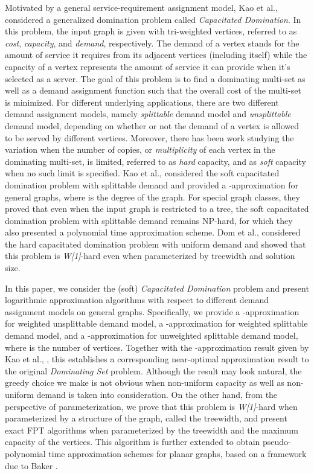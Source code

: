 \documentclass[a4paper,11pt]{article}
\theoremstyle{definition}
\begin{document}
Motivated by a general service-requirement assignment model, Kao et al., \cite{MJKCSLDTL09} considered a generalized domination problem called {\em Capacitated Domination}. In this problem, the input graph is given with tri-weighted vertices, referred to as {\em cost}, {\em capacity}, and {\em demand}, respectively. The demand of a vertex stands for the amount of service it requires from its adjacent vertices (including itself) while the capacity of a vertex represents the amount of service it can provide when it's selected as a server. The goal of this problem is to find a dominating multi-set as well as a demand assignment function such that the overall cost of the multi-set is minimized. For different underlying applications, there are two different demand assignment models, namely {\em splittable} demand model and {\em unsplittable} demand model, depending on whether or not the demand of a vertex is allowed to be served by different vertices. Moreover, there has been work studying the variation when the number of copies, or {\it multiplicity} of each vertex in the dominating multi-set, is limited, referred to as {\em hard} capacity, and as {\em soft} capacity when no such limit is specified. Kao et al., \cite{MJKCSLDTL09} considered the soft capacitated domination problem with splittable demand and provided a -approximation for general graphs, where  is the degree of the graph. For special graph classes, they proved that even when the input graph is restricted to a tree, the soft capacitated domination problem with splittable demand remains NP-hard, for which they also presented a polynomial time approximation scheme. Dom et al., \cite{DBLP:conf/iwpec/DomLSV08} considered the hard capacitated domination problem with uniform demand and showed that this problem is {\it W[1]}-hard even when parameterized by treewidth and solution size.

\smallskip



In this paper, we consider the (soft) {\em Capacitated Domination} problem and present logarithmic approximation algorithms with respect to different demand assignment models on general graphs. Specifically, we provide a -approximation
for weighted unsplittable demand model, a -approximation for weighted splittable demand model, and a -approximation for unweighted splittable demand model, where  is the number of vertices. Together with the -approximation result given by Kao et al., \cite{MJKCSLDTL09}, this establishes a corresponding near-optimal approximation result to the original {\em Dominating Set} problem. Although the result may look natural, the greedy choice we make is not obvious when non-uniform capacity as well as non-uniform demand is taken into consideration. On the other hand, from the perspective of parameterization, we prove that this problem is {\it W[1]}-hard when parameterized by a structure of the graph, called the treewidth, and present exact FPT algorithms when parameterized by the treewidth and the maximum capacity of the vertices. 
This algorithm is further extended to obtain pseudo-polynomial time approximation schemes for planar graphs, based on a framework due to Baker \cite{174650}.
\end{document}
